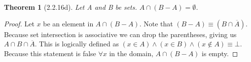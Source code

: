 \documentclass[a4paper, 12pt]{article}
\theoremstyle{plain}
\newtheorem*{theorem*}{Theorem}
\begin{document}
	
	\begin{theorem*}[2.2.16d]
		Let A and B be sets. $A \cap (B - A) = \emptyset$.
	\end{theorem*}
	
	\begin{proof}
		Let $x$ be an element in $A \cap (B - A)$. Note that $(B - A) \equiv (B \cap \overline{A})$. Because set intersection is associative we can drop the parentheses, giving us $A \cap B \cap \overline{A}$. This is logically defined as $(x \in A) \land (x \in B) \land (x \notin A) \equiv \bot$. Because this statement is false $\forall x$ in the domain, $A \cap (B - A)$ is empty.
	\end{proof}
\end{document}
